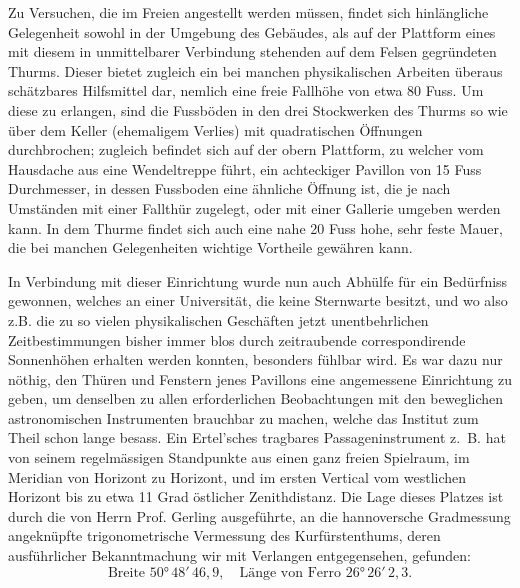 \documentclass[fontsize=10pt,paper=a5,pagesize=auto]{scrbook}
\newcommand{\origpage}[1]{\marginpar{\footnotesize\textit{S. #1}}}
\begin{document}
Zu Versuchen, die im Freien angestellt werden müssen, findet sich hinlängliche Gelegenheit sowohl in der Umgebung des Gebäudes, als auf der Plattform eines mit diesem in unmittelbarer Verbindung stehenden auf dem Felsen gegründeten Thurms. Dieser bietet zugleich ein bei manchen physikalischen Arbeiten überaus schätzbares Hilfsmittel dar, nemlich eine freie Fallhöhe von etwa 80 Fuss. Um diese zu erlangen, sind die Fussböden in den drei Stockwerken des Thurms so wie über dem Keller (ehemaligem Verlies) mit quadratischen Öffnungen durchbrochen; zugleich befindet sich auf der obern Plattform, zu welcher vom Hausdache aus eine Wendeltreppe führt, ein achteckiger Pavillon von 15 Fuss Durchmesser, in dessen Fussboden eine ähnliche Öffnung ist, die je nach Umständen mit einer Fallthür zugelegt, oder mit einer Gallerie umgeben werden kann. In dem Thurme findet sich auch eine nahe 20 Fuss hohe, sehr feste Mauer, die bei manchen Gelegenheiten wichtige Vortheile gewähren kann.

\origpage{599}
In Verbindung mit dieser Einrichtung wurde nun auch Abhülfe für ein Bedürfniss gewonnen, welches an einer Universität, die keine Sternwarte besitzt, und wo also z.B. die zu so vielen physikalischen Geschäften jetzt unentbehrlichen Zeitbestimmungen bisher immer blos durch zeitraubende correspondirende Sonnenhöhen erhalten werden konnten, besonders fühlbar wird. Es war dazu nur nöthig, den Thüren und Fenstern jenes Pavillons eine angemessene Einrichtung zu geben, um denselben zu allen erforderlichen Beobachtungen mit den beweglichen astronomischen Instrumenten brauchbar zu machen, welche das Institut zum Theil schon lange besass. Ein Ertel'sches tragbares Passageninstrument z.~B. hat von seinem regelmässigen Standpunkte aus einen ganz freien Spielraum, im Meridian von Horizont zu Horizont, und im ersten Vertical vom westlichen Horizont bis zu etwa 11 Grad östlicher Zenithdistanz. Die Lage dieses Platzes ist durch die von Herrn Prof. Gerling ausgeführte, an die hannoversche Gradmessung angeknüpfte trigonometrische Vermessung des Kurfürstenthums, deren ausführlicher Bekanntmachung wir mit Verlangen entgegensehen, gefunden:
\[
\text{Breite } 50°\, 48'\, 46{,}9,\quad \text{Länge von Ferro } 26°\, 26'\, 2{,}3.
\]
\end{document}
